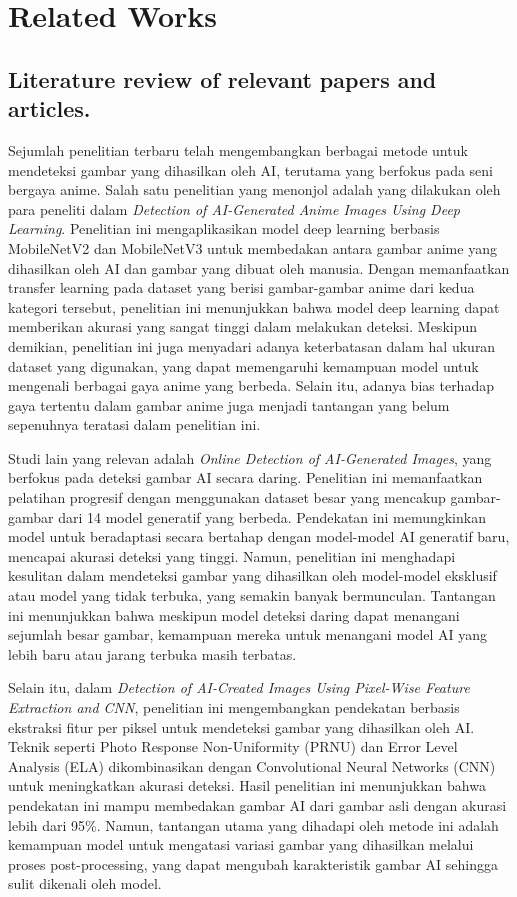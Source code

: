 \documentclass[12pt,a4paper]{article}
\begin{document}
\section{Related Works}

\subsection{Literature review of relevant papers and articles.}
Sejumlah penelitian terbaru telah mengembangkan berbagai metode untuk mendeteksi gambar yang dihasilkan oleh AI, terutama yang berfokus pada seni bergaya anime. Salah satu penelitian yang menonjol adalah yang dilakukan oleh para peneliti dalam \textit{Detection of AI-Generated Anime Images Using Deep Learning}. Penelitian ini mengaplikasikan model deep learning berbasis MobileNetV2 dan MobileNetV3 untuk membedakan antara gambar anime yang dihasilkan oleh AI dan gambar yang dibuat oleh manusia. Dengan memanfaatkan transfer learning pada dataset yang berisi gambar-gambar anime dari kedua kategori tersebut, penelitian ini menunjukkan bahwa model deep learning dapat memberikan akurasi yang sangat tinggi dalam melakukan deteksi. Meskipun demikian, penelitian ini juga menyadari adanya keterbatasan dalam hal ukuran dataset yang digunakan, yang dapat memengaruhi kemampuan model untuk mengenali berbagai gaya anime yang berbeda. Selain itu, adanya bias terhadap gaya tertentu dalam gambar anime juga menjadi tantangan yang belum sepenuhnya teratasi dalam penelitian ini.

Studi lain yang relevan adalah \textit{Online Detection of AI-Generated Images}, yang berfokus pada deteksi gambar AI secara daring. Penelitian ini memanfaatkan pelatihan progresif dengan menggunakan dataset besar yang mencakup gambar-gambar dari 14 model generatif yang berbeda. Pendekatan ini memungkinkan model untuk beradaptasi secara bertahap dengan model-model AI generatif baru, mencapai akurasi deteksi yang tinggi. Namun, penelitian ini menghadapi kesulitan dalam mendeteksi gambar yang dihasilkan oleh model-model eksklusif atau model yang tidak terbuka, yang semakin banyak bermunculan. Tantangan ini menunjukkan bahwa meskipun model deteksi daring dapat menangani sejumlah besar gambar, kemampuan mereka untuk menangani model AI yang lebih baru atau jarang terbuka masih terbatas.

Selain itu, dalam \textit{Detection of AI-Created Images Using Pixel-Wise Feature Extraction and CNN}, penelitian ini mengembangkan pendekatan berbasis ekstraksi fitur per piksel untuk mendeteksi gambar yang dihasilkan oleh AI. Teknik seperti Photo Response Non-Uniformity (PRNU) dan Error Level Analysis (ELA) dikombinasikan dengan Convolutional Neural Networks (CNN) untuk meningkatkan akurasi deteksi. Hasil penelitian ini menunjukkan bahwa pendekatan ini mampu membedakan gambar AI dari gambar asli dengan akurasi lebih dari 95\%.  Namun, tantangan utama yang dihadapi oleh metode ini adalah kemampuan model untuk mengatasi variasi gambar yang dihasilkan melalui proses post-processing, yang dapat mengubah karakteristik gambar AI sehingga sulit dikenali oleh model.
\end{document}
